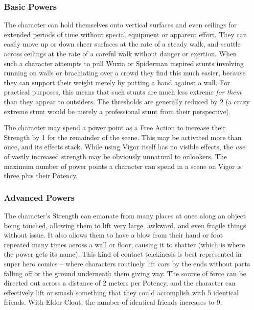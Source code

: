 \subsubsection{Basic Powers}

 The character can hold themselves onto vertical surfaces and even ceilings for extended periods of time without special equipment or apparent effort. They can easily move up or down sheer surfaces at the rate of a steady walk, and scuttle across ceilings at the rate of a careful walk without danger or exertion. When such a character attempts to pull Wuxia or Spiderman inspired stunts involving running on walls or brachiating over a crowd they find this much easier, because they can support their weight merely by putting a hand against a wall. For practical purposes, this means that such stunts are much less extreme \textit{for them} than they appear to outsiders. The thresholds are generally reduced by 2 (a crazy extreme stunt would be merely a professional stunt from their perspective).

 The character may spend a power point as a Free Action to increase their Strength by 1 for the remainder of the scene. This may be activated more than once, and its effects stack. While using Vigor itself has no visible effects, the \textit{use} of vastly increased strength may be obviously unnatural to onlookers. The maximum number of power points a character can spend in a scene on Vigor is three plus their Potency.

\subsubsection{Advanced Powers}

 The character's Strength can emanate from many places at once along an object being touched, allowing them to lift very large, awkward, and even fragile things without issue. It also allows them to have a blow from their hand or foot repeated many times across a wall or floor, causing it to shatter (which is where the power gets its name). This kind of contact telekinesis is best represented in super hero comics -- where characters routinely lift cars by the ends without parts falling off or the ground underneath them giving way. The source of force can be directed out across a distance of 2 meters per Potency, and the character can effectively lift or smash something that they could accomplish with 5 identical friends. With Elder Clout, the number of identical friends increases to 9.

